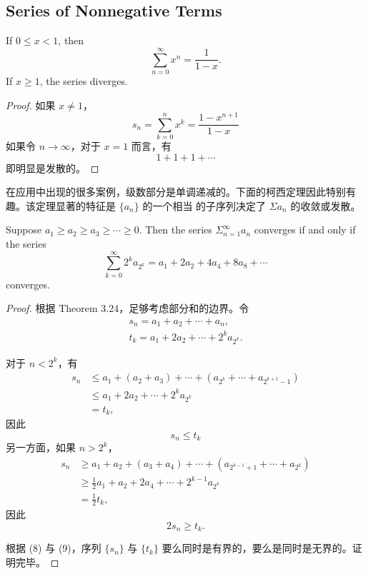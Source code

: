 \documentclass[../poma-notes.tex]{subfiles}
\begin{document}
\subsection*{Series of Nonnegative Terms}

\begin{theorem}
  If $0 \le x < 1$, then
  \[ \sum_{n=0}^{\infty} x^n = \frac{1}{1-x}. \]
  If $x \ge 1$, the series diverges.
\end{theorem}

\begin{proof}
  如果 $x \ne 1$，
  \[ s_n = \sum_{k=0}^{n} x^k = \frac{1-x^{n+1}}{1-x} \]
  如果令 $n \to \infty$，对于 $x=1$ 而言，有
  \[ 1 + 1 + 1 + \cdots \]
  即明显是发散的。
\end{proof}

在应用中出现的很多案例，级数部分是单调递减的。下面的柯西定理因此特别有趣。该定理显著的特征是 $\{a_n\}$ 的一个相当  的子序列决定了 $\Sigma a_n$
的收敛或发散。

\begin{theorem}
  Suppose $a_1 \ge a_2 \ge a_3 \ge \cdots \ge 0$. Then the series $\Sigma_{n=1}^{\infty} a_n$ converges if and only if the series
  \begin{equation}
    \sum_{k=0}^{\infty} 2^k a_{2^k} = a_1 + 2a_2 + 4a_4 + 8a_8 + \cdots
  \end{equation}
  converges.
\end{theorem}

\begin{proof}
  根据 Theorem 3.24，足够考虑部分和的边界。令
  \begin{gather*}
    s_n = a_1 + a_2 + \cdots + a_n, \\
    t_k = a_1 + 2a_2 + \cdots + 2^k a_{2^k}.
  \end{gather*}

  对于 $n < 2^k$，有
  \begin{align*}
    \mathcal{} s_n & \le a_1 + (a_2 + a_3) + \cdots + (a_{2^k} + \cdots + a_{2^{k+1}-1}) \\
                   & \le a_1 + 2a_2 + \cdots + 2^k a_{2^k}                               \\
                   & = t_k,
  \end{align*}
  因此
  \begin{equation}
    s_n \le t_k
  \end{equation}
  另一方面，如果 $n > 2^k$，
  \begin{align*}
    \mathcal{} s_n & \ge a_1 + a_2 + (a_3 + a_4) + \cdots + (a_{2^{k-1}+1} + \cdots + a_{2^k}) \\
                   & \ge \frac{1}{2}a_1 + a_2 + 2a_4 + \cdots + 2^{k-1}a_{2^k}                 \\
                   & = \frac{1}{2} t_k,
  \end{align*}
  因此
  \begin{equation*}
    2s_n \ge t_k.
  \end{equation*}

  根据 (8) 与 (9)，序列 $\{s_n\}$ 与 $\{t_k\}$ 要么同时是有界的，要么是同时是无界的。证明完毕。
\end{proof}
\end{document}
